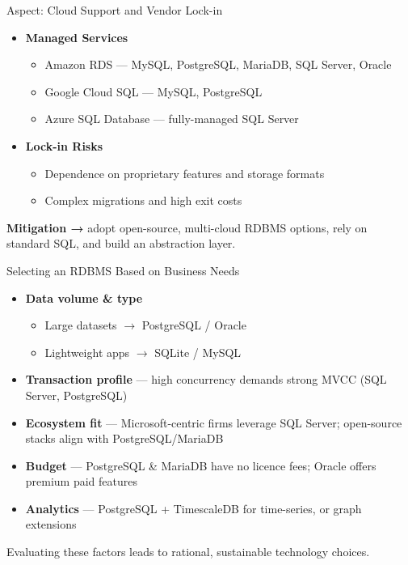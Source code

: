 \documentclass[aspectratio=169, table]{beamer}
\begin{document}
\begin{frame}{Aspect: Cloud Support and Vendor Lock-in}
\vspace{20pt}

\begin{itemize}
\item \textbf{Managed Services}
\begin{itemize}
	\item Amazon RDS — MySQL, PostgreSQL, MariaDB, SQL Server, Oracle  
	\item Google Cloud SQL — MySQL, PostgreSQL  
	\item Azure SQL Database — fully-managed SQL Server
\end{itemize}

\item \textbf{Lock-in Risks}
\begin{itemize}
	\item Dependence on proprietary features and storage formats  
	\item Complex migrations and high exit costs
\end{itemize}
\end{itemize}

\textbf{Mitigation →} adopt open-source, multi-cloud RDBMS options, rely on standard SQL, and build an abstraction layer.
\end{frame}

\begin{frame}{Selecting an RDBMS Based on Business Needs}
\vspace{20pt}

\begin{itemize}
\item \textbf{Data volume \& type}
\begin{itemize}
	\item Large datasets $\rightarrow$ PostgreSQL / Oracle  
	\item Lightweight apps $\rightarrow$ SQLite / MySQL
\end{itemize}

\item \textbf{Transaction profile} — high concurrency demands strong MVCC (SQL Server, PostgreSQL)

\item \textbf{Ecosystem fit} — Microsoft-centric firms leverage SQL Server; open-source stacks align with PostgreSQL/MariaDB

\item \textbf{Budget} — PostgreSQL \& MariaDB have no licence fees; Oracle offers premium paid features

\item \textbf{Analytics} — PostgreSQL + TimescaleDB for time-series, or graph extensions
\end{itemize}

Evaluating these factors leads to rational, sustainable technology choices.
\end{frame}
\end{document}
